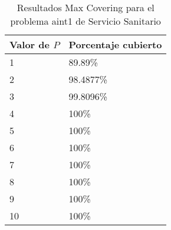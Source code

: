 \documentclass[a4paper,11pt]{article}
\begin{document}
\begin{table}[!htbp]
\label{4_max_servicio_sanitario}
\centering
\begin{tabular}{|l|l|}
\hline
Valor de ${P}$	& Porcentaje cubierto	\\ \hline
1	& 89.89\%	\\ \hline
2	& 98.4877\%	\\ \hline
3	& 99.8096\%	\\ \hline
4	& 100\%		\\ \hline
5	& 100\%		\\ \hline
6	& 100\%		\\ \hline
7	& 100\%		\\ \hline
8	& 100\%		\\ \hline
9	& 100\%		\\ \hline
10	& 100\%		\\ \hline
\end{tabular}
\caption{Resultados Max Covering para el problema aint1 de Servicio Sanitario}
\end{table}
\end{document}
